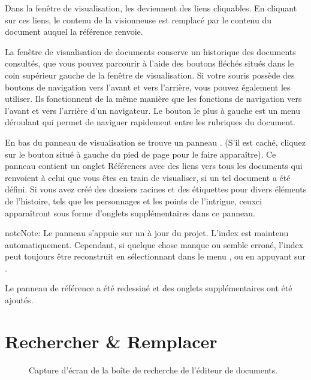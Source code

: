 \documentclass[a4paper,11pt,french]{sphinxmanual}
\begin{document}
\sphinxAtStartPar
Dans la fenêtre de visualisation, les {\hyperref[\detokenize{int_glossary:term-Reference}]{}} deviennent des liens cliquables. En cliquant sur ces liens, le contenu de la visionneuse est remplacé par le contenu du document auquel la référence renvoie.

\sphinxAtStartPar
La fenêtre de visualisation de documents conserve un historique des documents consultés, que vous pouvez parcourir à l’aide des boutons fléchés situés dans le coin supérieur gauche de la fenêtre de visualisation. Si votre souris possède des boutons de navigation vers l’avant et vers l’arrière, vous pouvez également les utiliser. Ils fonctionnent de la même manière que les fonctions de navigation vers l’avant et vers l’arrière d’un navigateur. Le bouton le plus à gauche est un menu déroulant qui permet de naviguer rapidement entre les rubriques du document.

\sphinxAtStartPar
En bas du panneau de visualisation se trouve un panneau . (S’il est caché, cliquez sur le bouton situé à gauche du pied de page pour le faire apparaître). Ce panneau contient un onglet Références avec des liens vers tous les documents qui renvoient à celui que vous êtes en train de visualiser, si un tel document a été défini. Si vous avez créé des dossiers racines et des étiquettes pour divers éléments de l’histoire, tels que les personnages et les points de l’intrigue, ceux\sphinxhyphen{}ci apparaîtront sous forme d’onglets supplémentaires dans ce panneau.

\begin{sphinxadmonition}{note}{Note:}
\sphinxAtStartPar
Le panneau  s’appuie sur un {\hyperref[\detokenize{int_glossary:term-Project-Index}]{}} à jour du projet. L’index est maintenu automatiquement. Cependant, si quelque chose manque ou semble erroné, l’index peut toujours être reconstruit en sélectionnant  dans le menu , ou en appuyant sur .
\end{sphinxadmonition}

\sphinxAtStartPar
{}Le panneau de référence a été redessiné et des onglets supplémentaires ont été ajoutés.


\section{Rechercher \& Remplacer}
\label{\detokenize{usage_writing:search-replace}}\label{\detokenize{usage_writing:a-ui-edit-search}}
\begin{figure}[htbp]
\centering
\capstart

\noindent{}
\caption{Capture d’écran de la boîte de recherche de l’éditeur de documents.}\label{\detokenize{usage_writing:id3}}\end{figure}
\end{document}
